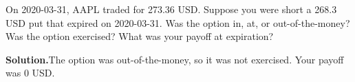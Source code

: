 \noindent On 2020-03-31, AAPL traded for 273.36 USD. Suppose you were short a 268.3 USD put that expired on 2020-03-31. Was the option in, at, or out-of-the-money? Was the option exercised? What was your payoff at expiration?

\vspace{9pt} 

\textbf{Solution.}The option was out-of-the-money, so it was not exercised. Your payoff was 0 USD.